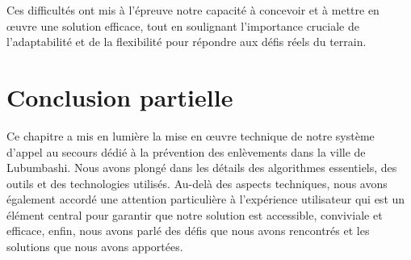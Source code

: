 Ces difficultés ont mis à l'épreuve notre capacité à concevoir et à mettre en œuvre une solution efficace, tout en soulignant l'importance cruciale de l'adaptabilité et de la flexibilité pour répondre aux défis réels du terrain.

\section{ Conclusion partielle}
Ce chapitre a mis en lumière la mise en œuvre technique de notre système d'appel au secours dédié à la prévention des enlèvements dans la ville de Lubumbashi. Nous avons plongé dans les détails des algorithmes essentiels, des outils et des technologies utilisés. Au-delà des aspects techniques, nous avons également accordé une attention particulière à l'expérience utilisateur qui est un élément central pour garantir que notre solution est accessible, conviviale et efficace, enfin, nous avons parlé des défis que nous avons rencontrés et les solutions que nous avons apportées.
